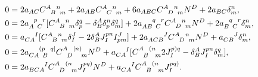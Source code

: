 \begin{equation}\label{prolong_2}
  \begin{aligned}
    0 &{} = 2 a_{AC} \gmc{A}{B}{n}{m} + 2 a_{AB} \gmc{A}{C}{n}{m} + 6 a_{ABC} \gmc{A}{D}{n}{m}N^D + 2a_{BC}\delta^n_m, \\
    0 &{} = 2 a_{A\hphantom pC}^{\hphantom Ap\hphantom Cr}\lbrack \gmc{A}{B}{n}{m} \delta^q_p - \delta^A_B\delta^n_p\delta^q_m \rbrack + 2a_{AB\hphantom qC}^{\hphantom{AB}q\hphantom Cr}\gmc{A}{D}{n}{m} N^D + 2a_{B\hphantom qC}^{\hphantom Bq\hphantom Cr}\delta^n_m, \\
    0 &{} = a_{CA}^{\hphantom{CA}I} \lbrack \gmc{A}{B}{n}{m} \delta^J_I - 2 \delta^A_B J^{pn}_I I^J_{pm} \rbrack + 2 a_{ACB}^{\hphantom{ACB}J} \gmc{A}{D}{n}{m} N^D + a_{CB}^{\hphantom{CB}J} \delta^n_m, \\
    0 &{} = 2a_{CA\hphantom{p}B}^{\hphantom{CA}(p\hphantom Bq\mid}\gmc{A}{D}{\mid n)}{m}N^D + a_{CA}^{\hphantom{CA}I} \lbrack \gmc{A}{B}{(n}{m} 2 J^{p)q}_I - \delta^A_B J^{pn}_I \delta^q_m \rbrack, \\
    0 &{} = 2a_{BCA}^{\hphantom{BCA}I} \gmc{A}{D}{(n}{m}J^{pq)}_I N^D + a_{CA}^{\hphantom{CA}I} \gmc{A}{B}{(n}{m} J^{pq)}_I.
  \end{aligned}
\end{equation}

